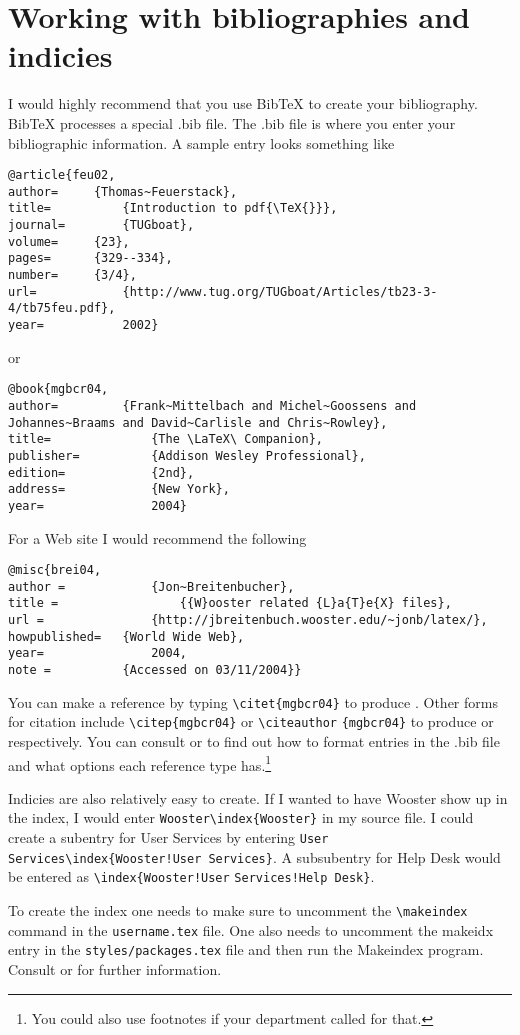 \chapter{Working with bibliographies and indicies}\label{bibind}
I would highly recommend that you use Bib\TeX{} to create your bibliography. Bib\TeX{} processes a special .bib file. The .bib file is where you enter your bibliographic information. A sample entry looks something like
\begin{singlespace}\small
\begin{verbatim}
@article{feu02,
author=		{Thomas~Feuerstack},
title=			{Introduction to pdf{\TeX{}}}, 
journal=		{TUGboat}, 
volume=		{23},
pages=		{329--334},
number=		{3/4},
url=			{http://www.tug.org/TUGboat/Articles/tb23-3-4/tb75feu.pdf},
year=			2002}
\end{verbatim}
\end{singlespace}
or
\begin{singlespace}\small
\begin{verbatim}
@book{mgbcr04,
author=			{Frank~Mittelbach and Michel~Goossens and
Johannes~Braams and David~Carlisle and Chris~Rowley},
title=				{The \LaTeX\ Companion},
publisher=			{Addison Wesley Professional},
edition=			{2nd},
address=			{New York},
year=				2004}
\end{verbatim}
\end{singlespace}

For a Web site I would recommend the following
\begin{singlespace}\small
\begin{verbatim}
@misc{brei04,
author = 			{Jon~Breitenbucher},
title = 				{{W}ooster related {L}a{T}e{X} files},
url = 				{http://jbreitenbuch.wooster.edu/~jonb/latex/},
howpublished=	{World Wide Web},
year=				2004,
note = 			{Accessed on 03/11/2004}}
\end{verbatim}
\end{singlespace}

You can make a reference by typing \verb|\citet{mgbcr04}| to produce \citet{mgbcr04}. Other forms for citation include \verb|\citep{mgbcr04}| or  \verb|\citeauthor| \verb|{mgbcr04}| to produce \citep{mgbcr04} or \citeauthor{mgbcr04} respectively. You can consult \citet{kd03} or \citet{mgbcr04} to find out how to format entries in the .bib file and what options each reference type has.\footnote{You could also use footnotes if your department called for that.}

Indicies are also relatively easy to create. If I wanted to have Wooster show up in the index, I would enter \verb|Wooster\index{Wooster}| in my source file. I could create a subentry for User Services by entering \verb|User Services|\verb|\index{Wooster!User Services}|. A subsubentry for Help Desk would be entered as \verb|\index{Wooster!User| \verb|Services!Help Desk}|.

To create the index one needs to make sure to uncomment the \verb|\makeindex| command in the \texttt{username.tex} file. One also needs to uncomment the makeidx entry in the \verb|styles/packages.tex| file and then run the Makeindex program. Consult \citet{kd03} or \citet{mgbcr04} for further information.